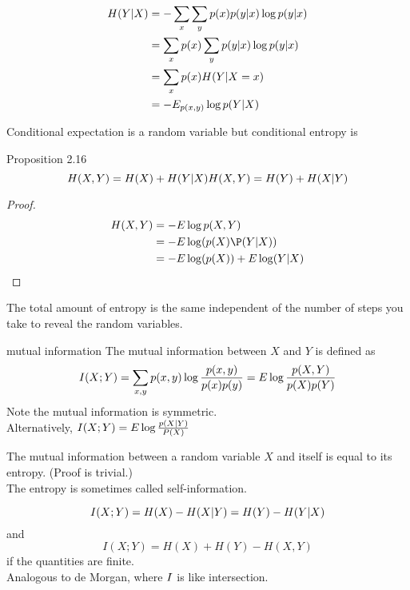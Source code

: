 \documentclass[../main.tex]{subfiles}
\begin{document}
\begin{align*}
H(Y|X)&=-\sum_x\sum_yp(x)p(y|x)\log p(y|x)\\
&= \sum_xp(x)\sum_yp(y|x)\log p(y|x)\\
&= \sum_xp(x) H(Y|X=x)\\
&= -E_{p(x,y)}\log p(Y|X)
\end{align*}
\begin{remark}
    Conditional expectation is a random variable but conditional entropy is 
\end{remark}
\begin{bbox}{Proposition 2.16}
    \begin{equation}
        H(X,Y) = H(X) + H(Y|X)\\
        H(X,Y)=H(Y) + H(X|Y)
    \end{equation}
    \begin{proof}
        \begin{align*}
            H(X,Y) &= -\E\log\p(X,Y)\\
            &= -\E\log (\p(X)\P(Y|X))\\
            &= -\E\log(\p(X))+\E\log(Y|X)
        \end{align*}
    \end{proof}
    The total amount of entropy is the same independent of the number of steps you take to reveal the random variables.
\end{bbox}
\begin{gbox}{mutual information}
    The mutual information between $X$ and $Y$ is defined as \begin{equation*}
        I(X;Y) = \sum_{x,y}p(x,y)\log \frac{p(x,y)}{p(x)p(y)} = E \log \frac{p(X,Y)}{p(X)p(Y)}
    \end{equation*}
Note the mutual information is symmetric.\\
Alternatively, $I(X;Y)=E \log \frac{p(X|Y)}{P(X)}$
\end{gbox}
\begin{proposition}
    The mutual information between a random variable $X$ and itself is equal to its entropy. (Proof is trivial.)\\
    The entropy is sometimes called self-information.
\end{proposition}
\begin{proposition}
    \begin{equation*}
        I(X;Y) = H(X)- H(X|Y)\\
        =H(Y)-H(Y|X)
    \end{equation*}
    and \begin{equation*}
        I(X;Y)=H(X)+H(Y)-H(X,Y)
    \end{equation*} if the quantities are finite.\\
    Analogous to de Morgan, where $I$ is like intersection.
\end{proposition}
\end{document}
